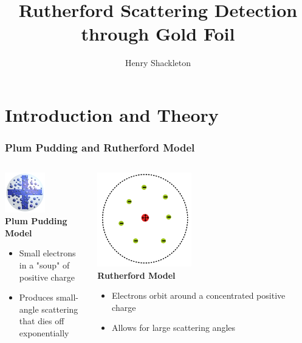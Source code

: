 \documentclass{beamer}
\title[Rutherford Scattering]{Rutherford Scattering Detection through Gold Foil}
\author{Henry Shackleton}
\begin{document}
\titlepage

\section{Introduction and Theory}

\begin{frame}
  \frametitle{Plum Pudding and Rutherford Model}
  \begin{columns}
    \begin{column}{0.5\textwidth}
      \begin{center}
      \includegraphics[width=0.5\textwidth]{plum}
      \\
      \textbf{Plum Pudding Model}
      \begin{itemize}
        \pause
        \item Small electrons in a "soup" of positive charge
          \pause
        \item Produces small-angle scattering that dies off exponentially
      \end{itemize}
    \end{center}
    \end{column}
    \begin{column}{0.5\textwidth}
      \begin{center}
      \includegraphics[width=0.44\textwidth]{rutherford.png}
      \\
      \textbf{Rutherford Model}
      \begin{itemize}
        \pause
      \item Electrons orbit around a concentrated positive charge
        \pause
      \item Allows for large scattering angles
    \end{itemize}
  \end{center}
  \end{column}
\end{columns}
\end{frame}
\end{document}
